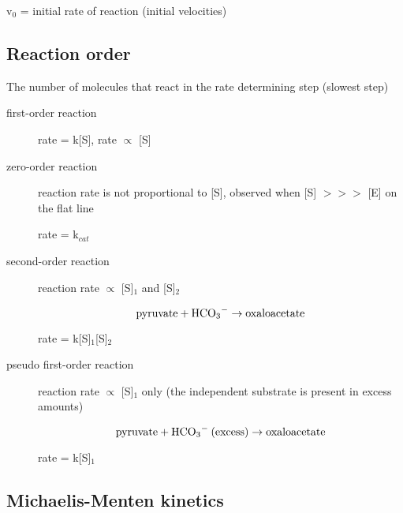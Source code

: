 \documentclass[letterpaper, 12pt]{article}
\begin{document}
v$_0$ = initial rate of reaction (initial velocities)

\subsection*{Reaction order}

The number of molecules that react in the rate determining step (slowest step)

\begin{description}
\item [first-order reaction] rate = k[S], rate $\propto$ [S]
\item [zero-order reaction] reaction rate is not proportional to [S], observed when [S] $>>>$ [E] on the flat line

rate = k$_{cat}$
\item [second-order reaction] reaction rate $\propto$ [S]$_1$ and [S]$_2$

$$ \text{pyruvate} + \ce{HCO3-} \to \text{oxaloacetate} $$

rate = k[S]$_1$[S]$_2$

\item [pseudo first-order reaction] reaction rate $\propto$ [S]$_1$ only (the independent substrate is present in excess amounts)

$$ \text{pyruvate} + \ce{HCO3-} \: \text{(excess)} \to \text{oxaloacetate} $$

rate = k[S]$_1$

\end{description}

\subsection*{Michaelis-Menten kinetics}
\end{document}
